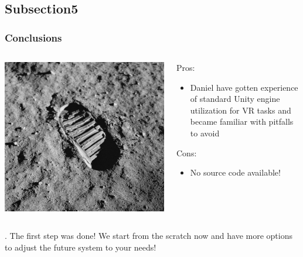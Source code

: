\documentclass[10pt, xcolor=x11names,compress]{beamer}
\begin{document}
\subsection{Subsection5}
\begin{frame}
	\frametitle{Conclusions}
	\begin{columns}
		\begin{column}{0.4\textwidth}
			\centering
			\includegraphics[height=0.4\textheight]{images/apollo-footprint.jpg}
		\end{column}
		\begin{column}{0.6\textwidth}
			Pros:
			\begin{itemize}
				\item Daniel have gotten experience of standard Unity engine utilization for VR tasks and became familiar with pitfalls to avoid
			\end{itemize}
			Cons:
			\begin{itemize}
				\item No source code available!
			\end{itemize}
		\end{column}
	\end{columns}
	\centering
	.\newline\newline
	The first step was done! We start from the scratch now and have more options to adjust the future system to your needs!\\
\end{frame}
\end{document}
